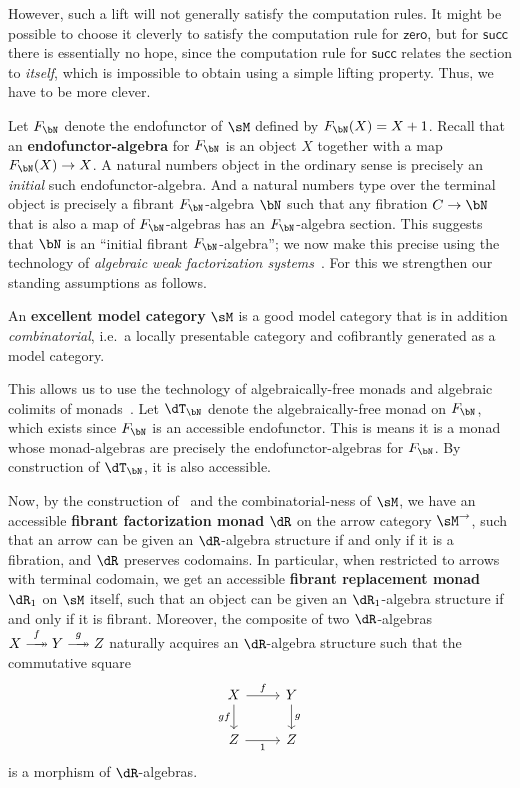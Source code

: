\documentclass{amsart}
\def\zero{\mathsf{zero}}
\def\succ{\mathsf{succ}}
\begin{document}
However, such a lift will not generally satisfy the computation rules.
It might be possible to choose it cleverly to satisfy the computation rule for $\zero$, but for $\succ$ there is essentially no hope, since the computation rule for $\succ$ relates the section to \emph{itself}, which is impossible to obtain using a simple lifting property.
Thus, we have to be more clever.

Let $F_\bN$ denote the endofunctor of $\sM$ defined by $F_\bN(X) = X+1$.
Recall that an \textbf{endofunctor-algebra} for $F_\bN$ is an object $X$ together with a map $F_\bN(X) \to X$.
A natural numbers object in the ordinary sense is precisely an \emph{initial} such endofunctor-algebra.
And a natural numbers type over the terminal object is precisely a fibrant $F_\bN$-algebra $\bN$ such that any fibration $C\to\bN$ that is also a map of $F_\bN$-algebras has an $F_\bN$-algebra section.
This suggests that $\bN$ is an ``initial fibrant $F_\bN$-algebra''; we now make this precise using the technology of \emph{algebraic weak factorization systems}~\cite{gt:nwfs,garner:soa,riehl:nwfs-model}.
For this we strengthen our standing assumptions as follows.

\begin{defn}
  An \textbf{excellent model category} $\sM$ is a good model category that is in addition \emph{combinatorial}, i.e.\ a locally presentable category and cofibrantly generated as a model category.
\end{defn}

This allows us to use the technology of algebraically-free monads and algebraic colimits of monads~\cite{kelly:transfinite,nlab:transfinite}.
Let $\dT_\bN$ denote the algebraically-free monad on $F_\bN$, which exists since $F_\bN$ is an accessible endofunctor.
This is means it is a monad whose monad-algebras are precisely the endofunctor-algebras for $F_\bN$.
By construction of $\dT_\bN$, it is also accessible.

Now, by the construction of~\cite{garner:soa} and the combinatorial-ness of $\sM$, we have an accessible \textbf{fibrant factorization monad} $\dR$ on the arrow category $\sM^\to$, such that an arrow can be given an $\dR$-algebra structure if and only if it is a fibration, and $\dR$ preserves codomains.
In particular, when restricted to arrows with terminal codomain, we get an accessible \textbf{fibrant replacement monad} $\dR_1$ on $\sM$ itself, such that an object can be given an $\dR_1$-algebra structure if and only if it is fibrant.
Moreover, the composite of two $\dR$-algebras $X \xfib{f} Y \xfib{g} Z$ naturally acquires an $\dR$-algebra structure such that the commutative square
\[
\begin{tikzcd}
  X \ar[d,"gf",swap] \ar[r,"f"] & Y \ar[d,"g"] \\ Z \ar[r,"1",swap]& Z
\end{tikzcd}
\]
is a morphism of $\dR$-algebras.
\end{document}

